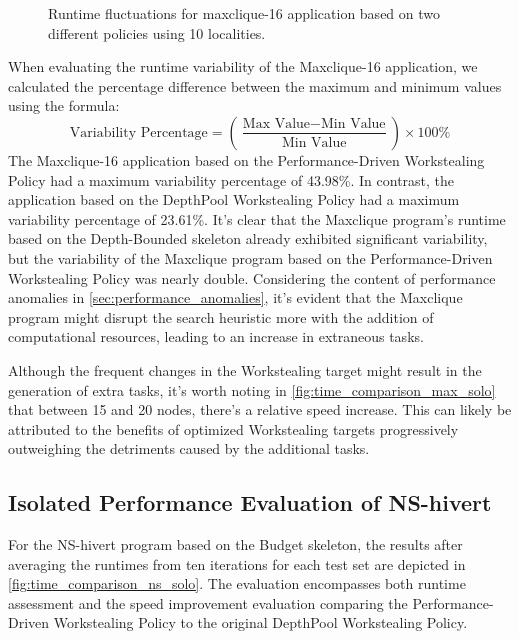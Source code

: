 \documentclass{mproj}
\begin{document}
\begin{itemize}
\begin{figure}[h]
              \caption{Runtime fluctuations for maxclique-16 application based on two different policies using 10 localities.}
              \label{fig:maxclique_16_fluctuations}
          \end{figure}
          When evaluating the runtime variability of the Maxclique-16 application,
          we calculated the percentage difference between the maximum and minimum values using the formula:
          \begin{equation}
              \text{Variability Percentage} = \left( \frac{\text{Max Value} - \text{Min Value}}{\text{Min Value}} \right) \times 100\%
              \label{eq:variability_percentage}
          \end{equation}
          The Maxclique-16 application based on the Performance-Driven Workstealing Policy had a maximum variability percentage of 43.98\%.
          In contrast, the application based on the DepthPool Workstealing Policy had a maximum variability percentage of 23.61\%.
          It's clear that the Maxclique program's runtime based on the Depth-Bounded skeleton already exhibited significant variability,
          but the variability of the Maxclique program based on the Performance-Driven Workstealing Policy was nearly double.
          Considering the content of performance anomalies in \ref{sec:performance_anomalies},
          it's evident that the Maxclique program might disrupt the search heuristic more with the addition of computational resources,
          leading to an increase in extraneous tasks.

          Although the frequent changes in the Workstealing target might result in the generation of extra tasks,
          it's worth noting in \cref{fig:time_comparison_max_solo} that between 15 and 20 nodes,
          there's a relative speed increase.
          This can likely be attributed to the benefits of optimized Workstealing targets progressively outweighing the detriments caused by the additional tasks.
\end{itemize}

\subsection{Isolated Performance Evaluation of NS-hivert}

For the NS-hivert program based on the Budget skeleton, the results after averaging the runtimes from ten iterations for each test set are depicted in \cref{fig:time_comparison_ns_solo}.
The evaluation encompasses both runtime assessment and the speed improvement evaluation comparing the Performance-Driven Workstealing Policy to the original DepthPool Workstealing Policy.
\end{document}
